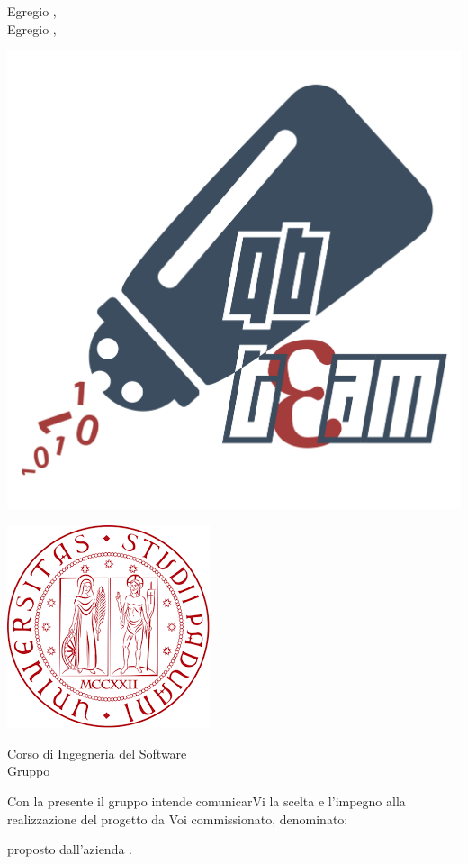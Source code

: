 \documentclass[12pt]{letter}
\begin{document}
    \begin{letter}
        { Egregio \VT{},\\Egregio \CR{},}
        \begin{minipage}{.4\textwidth}
            \begin{flushleft}
                \includegraphics[width=.4\linewidth]{../Utilita/Immagini/qbteam.png}
            \end{flushleft}
        \end{minipage}
        \begin{minipage}{.5\textwidth}
            \begin{flushright}
                \includegraphics[width=.4\linewidth]{../Utilita/Immagini/LogoUniPD.png}
            \end{flushright}
        \end{minipage}
        {    
        \begin{flushleft}
            Corso di Ingegneria del Software\\ Gruppo \Gruppo{}\\ 
        \end{flushleft}
        }
        \opening{ Con la presente il gruppo \Gruppo{} intende comunicarVi la scelta e l'impegno alla realizzazione del progetto da Voi commissionato, denominato:}
        \begin{center}
           \textbf{\NomeProgetto{}} 
        \end{center}
        proposto dall'azienda \textbf{\Proponente{}}.\\

\end{letter}
\end{document}
